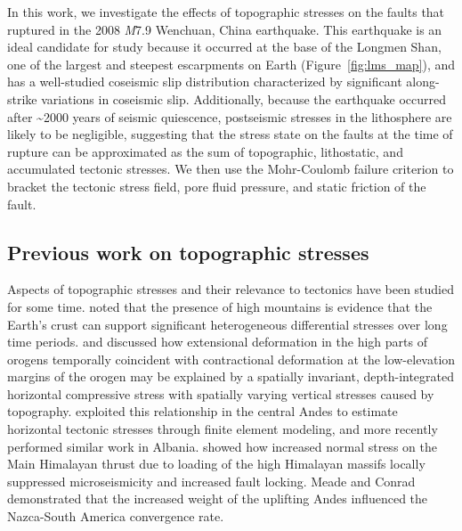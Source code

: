 \documentclass[twocolumn,jgrga]{AGUTeX}
\begin{document}
\begin{article}
In this work, we investigate the effects of topographic stresses on the
faults that ruptured in the 2008 \emph{M}7.9 Wenchuan, China earthquake.
This earthquake is an ideal candidate for study because it occurred at
the base of the Longmen Shan, one of the largest and steepest
escarpments on Earth (Figure~\ref{fig:lms_map}), and has a well-studied
coseismic slip distribution characterized by significant along-strike
variations in coseismic slip. Additionally, because the earthquake
occurred after \textasciitilde{}2000 years of seismic quiescence,
postseismic stresses in the lithosphere are likely to be negligible,
suggesting that the stress state on the faults at the time of rupture
can be approximated as the sum of topographic, lithostatic, and
accumulated tectonic stresses. We then use the Mohr-Coulomb failure
criterion to bracket the tectonic stress field, pore fluid pressure, and
static friction of the fault.

\subsection{Previous work on topographic
stresses}\label{previous-work-on-topographic-stresses}

Aspects of topographic stresses and their relevance to tectonics have
been studied for some time. \citet{jeffreys1924} noted that the
presence of high mountains is evidence that the Earth's crust can
support significant heterogeneous differential stresses over long time
periods. \citet{dalmayrac1981} and \citet{molnar1988} discussed how 
extensional deformation in
the high parts of orogens temporally coincident with contractional
deformation at the low-elevation margins of the orogen may be explained
by a spatially invariant, depth-integrated horizontal compressive stress
with spatially varying vertical stresses caused by topography.
\citet{richardson1994} exploited this
relationship in the central Andes to estimate horizontal tectonic
stresses through finite element modeling, and more recently 
\citet{copley2009} 
performed similar work in Albania. \citet{bollinger2004} showed how 
increased normal stress on the Main
Himalayan thrust due to loading of the high Himalayan massifs locally
suppressed microseismicity and increased fault locking. Meade and Conrad
\citet{meade2008} demonstrated that the increased weight of the
uplifting Andes influenced the Nazca-South America convergence rate.


\end{article}
\end{document}
